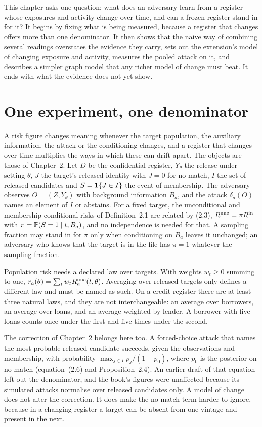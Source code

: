 This chapter asks one question: what does an adversary learn from a register whose exposures
and activity change over time, and can a frozen register stand in for it? It begins by fixing what
is being measured, because a register that changes offers more than one denominator. It
then shows that the naive way of combining several readings overstates the evidence they
carry, sets out the extension's model of changing exposure and activity, measures the pooled
attack on it, and describes a simpler graph model that any richer model of change must beat.
It ends with what the evidence does not yet show.

\section{One experiment, one denominator}

A risk figure changes meaning whenever the target population, the auxiliary information,
the attack or the conditioning changes, and a register that changes over time multiplies
the ways in which these can drift apart. The objects are those of Chapter~2. Let $D$ be the
confidential register, $Y_\theta$ the release under setting $\theta$, $J$ the target's released identity with $J=0$
for no match, $I$ the set of released candidates and $S=\mathbf{1}\{J\in I\}$ the event of membership.
The adversary observes $O=(Z,Y_\theta)$ with background information $B_a$, and the attack $\delta_a(O)$
names an element of $I$ or abstains. For a fixed target, the unconditional and membership-conditional risks of Definition~2.1 are related by (2.3), $R^{\rm unc}=\pi R^{\rm in}$ with $\pi=\mathbb{P}(S=1\mid t,B_a)$, and no independence is needed for that. A sampling fraction may stand in for $\pi$ only when
conditioning on $B_a$ leaves it unchanged; an adversary who knows that the target is in the
file has $\pi=1$ whatever the sampling fraction.

Population risk needs a declared law over targets. With weights $w_t\ge0$ summing to one,
$r_a(\theta)=\sum_t w_t R^{\rm unc}_a(t,\theta)$. Averaging over released targets only defines a different law and
must be named as such. On a credit register there are at least three natural laws, and they
are not interchangeable: an average over borrowers, an average over loans, and an average
weighted by lender. A borrower with five loans counts once under the first and five times
under the second.

The correction of Chapter~2 belongs here too. A forced-choice attack that names the most
probable released candidate succeeds, given the observations and membership, with probability $\max_{j\in I}p_j/(1-p_0)$, where $p_0$ is the posterior on no match (equation~(2.6) and Proposition~2.4).
An earlier draft of that equation left out the denominator, and the book's figures were unaffected because its simulated attacks normalise over released candidates only. A model
of change does not alter the correction. It does make the no-match term harder to ignore,
because in a changing register a target can be absent from one vintage and present in the
next.

